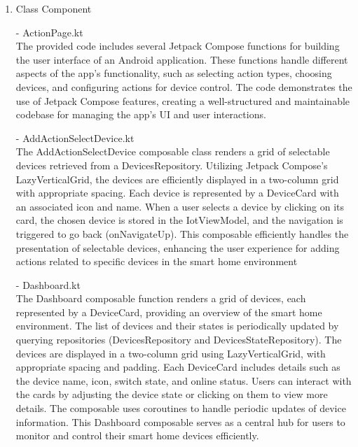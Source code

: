 \begin{enumerate}
                        \item Class Component \\
                        \item[-] ActionPage.kt \\
                              The provided code includes several Jetpack Compose functions for building the user interface of an Android application. These functions handle different aspects of the app's functionality, such as selecting action types, choosing devices, and configuring actions for device control. The code demonstrates the use of Jetpack Compose features, creating a well-structured and maintainable codebase for managing the app's UI and user interactions.\\
                        \item[-] AddActionSelectDevice.kt \\
                              The AddActionSelectDevice composable class renders a grid of selectable devices retrieved from a DevicesRepository. Utilizing Jetpack Compose's LazyVerticalGrid, the devices are efficiently displayed in a two-column grid with appropriate spacing. Each device is represented by a DeviceCard with an associated icon and name. When a user selects a device by clicking on its card, the chosen device is stored in the IotViewModel, and the navigation is triggered to go back (onNavigateUp). This composable efficiently handles the presentation of selectable devices, enhancing the user experience for adding actions related to specific devices in the smart home environment\\
                        \item[-] Dashboard.kt \\
                              The Dashboard composable function renders a grid of devices, each represented by a DeviceCard, providing an overview of the smart home environment. The list of devices and their states is periodically updated by querying repositories (DevicesRepository and DevicesStateRepository). The devices are displayed in a two-column grid using LazyVerticalGrid, with appropriate spacing and padding. Each DeviceCard includes details such as the device name, icon, switch state, and online status. Users can interact with the cards by adjusting the device state or clicking on them to view more details. The composable uses coroutines to handle periodic updates of device information. This Dashboard composable serves as a central hub for users to monitor and control their smart home devices efficiently.\\

\end{enumerate}
